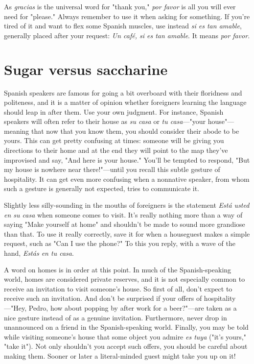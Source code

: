 \documentclass[14pt,a4paper,oneside]{memoir}
\begin{document}
As \emph{gracias} is the universal word for "thank you," \emph{por favor} is
all you will ever need for "please." Always remember to use it when
asking for something. If you're tired of it and want to flex some Spanish muscles, use instead \emph{si es tan amable}, generally placed after your
request: \emph{Un café, si es tan amable}. It means \emph{por favor}.

\section{Sugar versus saccharine}

Spanish speakers are famous for going a bit overboard with
their floridness and politeness, and it is a matter of opinion whether
foreigners learning the language should leap in after them. Use your
own judgment. For instance, Spanish speakers will often refer to their
house as \emph{su casa} or \emph{tu casa}---"your house"---meaning that now that
you know them, you should consider their abode to be yours. This can
get pretty confusing at times: someone will be giving you directions to
their home and at the end they will point to the map they've improvised and say, "And here is your house." You'll be tempted to respond,
"But my house is nowhere near there!"---until you recall this subtle
gesture of hospitality. It can get even more confusing when a nonnative speaker, from whom such a gesture is generally not expected,
tries to communicate it.

Slightly less silly-sounding in the mouths of foreigners is the
statement \emph{Está usted en su casa} when someone comes to visit. It's really nothing more than a way of saying "Make yourself at home" and
shouldn't be made to sound more grandiose than that. To use it really
correctly, save it for when a houseguest makes a simple request, such
as "Can I use the phone?" To this you reply, with a wave of the hand,
\emph{Estás en tu casa}.

A word on homes is in order at this point. In much of the
Spanish-speaking world, homes are considered private reserves, and it
is not especially common to receive an invitation to visit someone's
house. So first of all, don't expect to receive such an invitation. And
don't be surprised if your offers of hospitality---"Hey, Pedro, how about
popping by after work for a beer?"---are taken as a nice gesture instead
of as a genuine invitation. Furthermore, never drop in unannounced on
a friend in the Spanish-speaking world. Finally, you may be told while
visiting someone's house that some object you admire \emph{es tuya} ("it's
yours," "take it"). Not only shouldn't you accept such offers, you
should be careful about making them. Sooner or later a literal-minded
guest might take you up on it!
\end{document}
